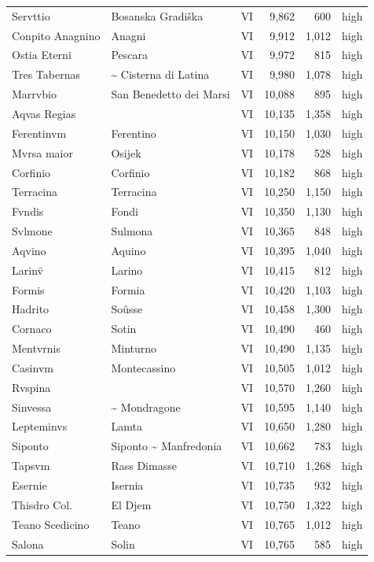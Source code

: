 \documentclass[11pt,a4paper]{article}
\begin{document}
{\begin{longtable}{p{4.6cm}p{5.2cm}lrrl}
Servttio & Bosanska Gradiška & VI & 9,862 & 600 & high\\
Conpito Anagnino & Anagni & VI & 9,912 & 1,012 & high\\
Ostia Eterni & Pescara & VI & 9,972 & 815 & high\\
Tres Tabernas & \textasciitilde{} Cisterna di Latina & VI & 9,980 & 1,078 & high\\
Marrvbio & San Benedetto dei Marsi & VI & 10,088 & 895 & high\\
Aqvas Regias &  & VI & 10,135 & 1,358 & high\\
Ferentinvm & Ferentino & VI & 10,150 & 1,030 & high\\
Mvrsa maior & Osijek & VI & 10,178 & 528 & high\\
Corfinio & Corfinio & VI & 10,182 & 868 & high\\
Terracina & Terracina & VI & 10,250 & 1,150 & high\\
Fvndis & Fondi & VI & 10,350 & 1,130 & high\\
Svlmone & Sulmona & VI & 10,365 & 848 & high\\
Aqvino & Aquino & VI & 10,395 & 1,040 & high\\
Larinv̄ & Larino & VI & 10,415 & 812 & high\\
Formis & Formia & VI & 10,420 & 1,103 & high\\
Hadrito & Soûsse & VI & 10,458 & 1,300 & high\\
Cornaco & Sotin & VI & 10,490 & 460 & high\\
Mentvrnis & Minturno & VI & 10,490 & 1,135 & high\\
Casinvm & Montecassino & VI & 10,505 & 1,012 & high\\
Rvspina &  & VI & 10,570 & 1,260 & high\\
Sinvessa & \textasciitilde{} Mondragone & VI & 10,595 & 1,140 & high\\
Lepteminvs & Lamta & VI & 10,650 & 1,280 & high\\
Siponto & Siponto \textasciitilde{} Manfredonia & VI & 10,662 & 783 & high\\
Tapsvm & Rass Dimasse & VI & 10,710 & 1,268 & high\\
Esernie & Isernia & VI & 10,735 & 932 & high\\
Thisdro Col. & El Djem & VI & 10,750 & 1,322 & high\\
Teano Scedicino & Teano & VI & 10,765 & 1,012 & high\\
Salona & Solin & VI & 10,765 & 585 & high\\

\end{longtable}}
\end{document}
